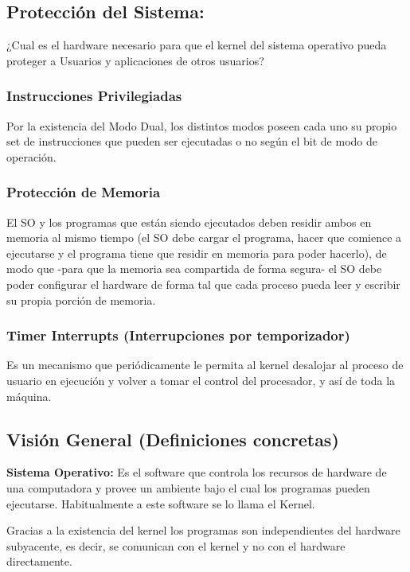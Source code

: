 \documentclass[../main.tex]{subfiles}
\begin{document}
    \subsection{Protección del Sistema:}
        ¿Cual es el hardware necesario para que el kernel del sistema operativo pueda proteger a Usuarios y aplicaciones de otros usuarios?

        \subsubsection*{Instrucciones Privilegiadas}
            Por la existencia del Modo Dual, los distintos modos poseen cada uno su propio set de instrucciones que pueden ser ejecutadas o no según el bit de modo de operación.
            
        \subsubsection*{Protección de Memoria}
            El SO y los programas que están siendo ejecutados deben residir ambos en memoria al mismo tiempo (el SO debe cargar el programa, hacer que comience a ejecutarse y el programa tiene que residir en memoria para poder hacerlo), de modo que -para que la memoria sea compartida de forma segura- el SO debe poder configurar el hardware de forma tal que cada proceso pueda leer y escribir su propia porción de memoria.
        
        \subsubsection*{Timer Interrupts (Interrupciones por temporizador)}
            Es un mecanismo que periódicamente le permita al kernel desalojar al proceso de usuario en ejecución y volver a tomar el control del procesador, y así de toda la máquina.

    \subsection{Visión General (Definiciones concretas)}
        \textbf{Sistema Operativo:} Es el software que controla los recursos de hardware de una computadora y provee un ambiente bajo el cual los programas pueden ejecutarse. Habitualmente a este software se lo llama el Kernel.

        Gracias a la existencia del kernel los programas son independientes del hardware subyacente, es decir, se comunican con el kernel y no con el hardware directamente.  
\end{document}
